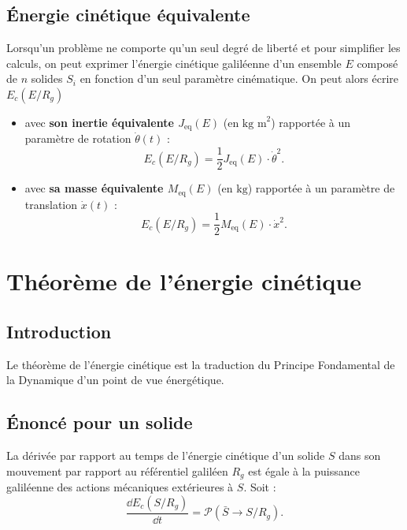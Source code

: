 \documentclass[10pt,fleqn]{article} %
\begin{document}
\subsection{Énergie cinétique équivalente}

\begin{defi}
Lorsqu'un problème ne comporte qu'un seul degré de liberté et pour simplifier les calculs, on peut exprimer l'énergie cinétique galiléenne d'un ensemble $E$ composé de $n$ solides $S_i$ en fonction d'un seul paramètre cinématique.
On peut alors écrire $E_c(E/R_g)$ 
\begin{itemize}
\item avec \textbf{son inertie équivalente $J_{\text{eq}}(E)$} (en $\text{kg m}^2$) rapportée à un paramètre de rotation $\dot{\theta}(t)$ : 
$$
E_c(E/R_g)=\frac{1}{2}J_{\text{eq}}(E)\cdot \dot{\theta}^2.
$$
\item avec \textbf{sa masse équivalente $M_{\text{eq}}(E)$} (en $\text{kg}$) rapportée à un paramètre de translation $\dot{x}(t)$ : 
$$
E_c(E/R_g)=\frac{1}{2}M_{\text{eq}}(E)\cdot \dot{x}^2.
$$
\end{itemize}
\end{defi}

\section{Théorème de l'énergie cinétique}
\subsection{Introduction}
Le théorème de l'énergie cinétique est la traduction du Principe Fondamental de la Dynamique d'un point de vue énergétique.
\subsection{Énoncé pour un solide}

\begin{theorem}
La dérivée par rapport au temps de l'énergie cinétique d'un solide $S$ dans son mouvement par rapport au référentiel galiléen $R_g$ est égale à la puissance galiléenne des actions mécaniques extérieures à $S$.
Soit :
$$
\dfrac{\dd E_c(S/R_g)}{\dd t}=\mathcal{P}(\bar S \rightarrow S/R_g).
$$

\end{theorem}


\end{document}
